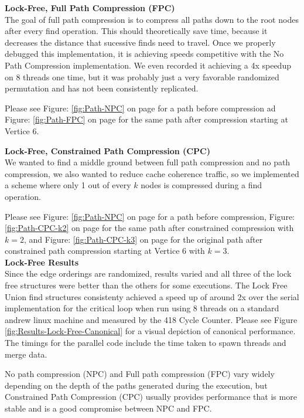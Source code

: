 \documentclass[11pt]{article}
\begin{document}
\newpage

\textbf{Lock-Free, Full Path Compression (FPC)}\\
The goal of full path compression is to compress all paths down to the root nodes after every find operation. This should theoretically save time, because it decreases the distance that sucessive finds need to travel. Once we properly debugged this implementation, it is achieving speeds competitive with the No Path Compression implementation. We even recorded it achieving a 4x speedup on 8 threads one time, but it was probably just a very favorable randomized permutation and has not been consistently replicated.

Please see Figure: \ref{fig:Path-NPC} on page \pageref{fig:Path-NPC} for a path before compression ad Figure: \ref{fig:Path-FPC} on page \pageref{fig:Path-FPC} for the same path after compression starting at Vertice 6.

\textbf{Lock-Free, Constrained Path Compression (CPC)}\\
We wanted to find a middle ground between full path compression and no path compression, we also wanted to reduce cache coherence traffic, so we implemented a scheme where only 1 out of every $k$ nodes is compressed during a find operation.

Please see Figure: \ref{fig:Path-NPC} on page \pageref{fig:Path-NPC} for a path before compression, Figure: \ref{fig:Path-CPC-k2} on page \pageref{fig:Path-CPC-k2} for the same path after constrained compression with $k=2$, and Figure: \ref{fig:Path-CPC-k3} on page \pageref{fig:Path-CPC-k3} for the original path after constrained path compression starting at Vertice 6 with $k=3$.\\


\textbf{Lock-Free Results}\\
Since the edge orderings are randomized, results varied and all three of the lock free structures were better than the others for some executions. The Lock Free Union find structures consistenty achieved a speed up of around 2x over the serial implementation for the critical loop when run using 8 threads on a standard andrew linux machine and measured by the 418 Cycle Counter. Please see Figure \ref{fig:Results-Lock-Free-Canonical} for a visual depiction of canonical performance.\\

The timings for the parallel code include the time taken to spawn threads and merge data.

No path compression (NPC) and Full path compression (FPC) vary widely depending on the depth of the paths generated during the execution, but Constrained Path Compression (CPC) usually provides performance that is more stable and is a good compromise between NPC and FPC.\\
\end{document}
